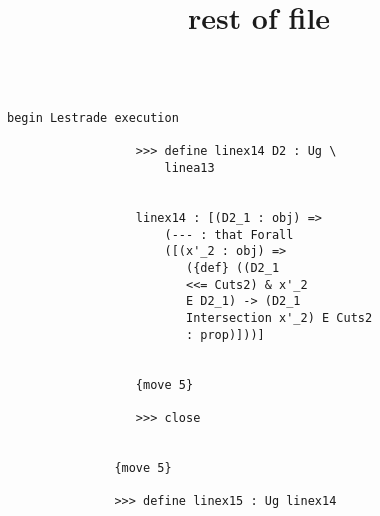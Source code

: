 \documentclass[12pt]{article}
\title {rest of file}
\begin{document}
\begin{verbatim}

begin Lestrade execution

                  >>> define linex14 D2 : Ug \
                      linea13


                  linex14 : [(D2_1 : obj) => 
                      (--- : that Forall 
                      ([(x'_2 : obj) => 
                         ({def} ((D2_1 
                         <<= Cuts2) & x'_2 
                         E D2_1) -> (D2_1 
                         Intersection x'_2) E Cuts2 
                         : prop)]))]


                  {move 5}

                  >>> close


               {move 5}

               >>> define linex15 : Ug linex14



\end{verbatim}
\end{document}
